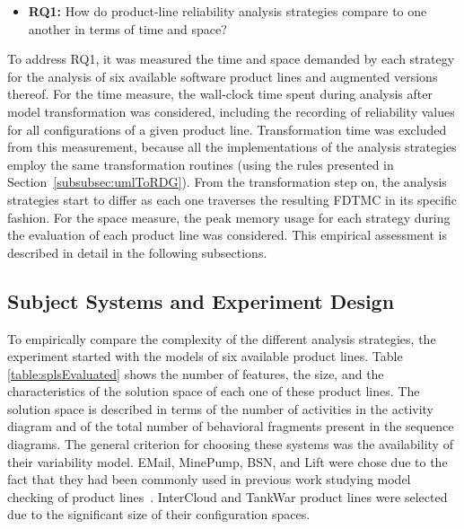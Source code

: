 \begin{itemize} 
  \item \textbf{RQ1:} How do product-line reliability analysis strategies
	  compare to one another in terms of time and space?
\end{itemize}


To address RQ1, it was measured the time and space demanded by each strategy for
the analysis of six available software product lines and augmented versions
thereof.  For the time measure, the wall-clock time spent during analysis after
model transformation was considered, including the recording of reliability
values for all configurations of a given product line. Transformation time was
excluded from this measurement, because all the implementations of the analysis
strategies employ the same transformation routines (using the rules presented in
Section~\ref{subsubsec:umlToRDG}).  From the transformation step on, the
analysis strategies start to differ as each one traverses the resulting FDTMC in
its specific fashion.  For the space measure, the peak memory usage for each
strategy during the evaluation of each product line was considered.  This
empirical assessment is described in detail in the following subsections.




\subsection{Subject Systems and Experiment Design
	\label{subsec:subjSystemsExperimentDesign}}

To empirically compare the complexity of the different analysis strategies, the
experiment started with the models of six available product lines.  Table
\ref{table:splsEvaluated} shows the number of features, the size, and the
characteristics of the solution space of each one of these product lines.  The
solution space is described in terms of the number of activities in the activity
diagram and of the total number of behavioral fragments present in the sequence
diagrams.  The general criterion for choosing these systems was the availability
of their variability model. EMail, MinePump, BSN, and Lift were chose due to the
fact that they had been commonly used in previous work studying model checking
of product
lines~\cite{classen_formal_2014,classen_featured_2013,rodrigues_modeling_2015}.
InterCloud and TankWar product lines were selected due to the significant size
of their configuration spaces.

